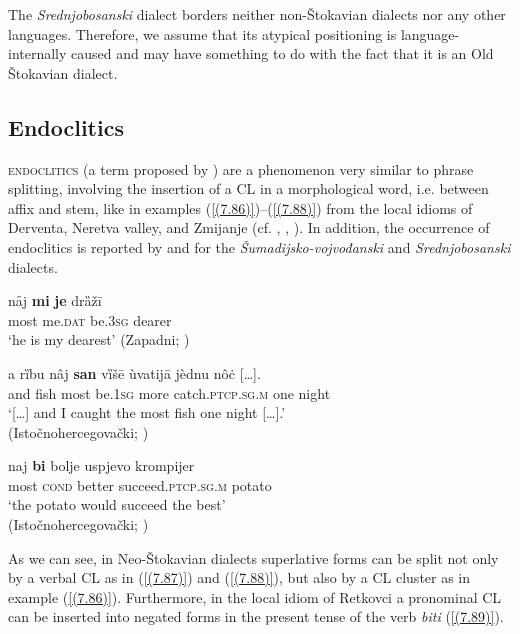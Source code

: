 \noindent The \textit{Srednjobosanski} dialect borders neither non-Štokavian dialects nor any other languages. Therefore, we assume that its atypical positioning is language-in\-ter\-nal\-ly caused and may have something to do with the fact that it is an Old Štokavian dialect.

\subsection{Endoclitics}

\textsc{endoclitics} (a term proposed by \citealt{RadanovicKocic88}) are a phenomenon very similar to phrase splitting, involving the insertion of a CL in a morphological word, i.e. between affix and stem, like in examples (\ref{(7.86)})--(\ref{(7.88)}) from the local idioms of Derventa, Neretva valley, and Zmijanje (cf. \citealt[58]{Lisac03}, \citealt[67]{Okuka08}, \citealt[195]{VuksaNahod14}). In addition, the occurrence of endoclitics is reported by \citet[279]{Nikolic66} and \citet[23]{Halilovic05} for the \textit{Šumadijsko-vojvođanski} and \textit{Srednjobosanski} dialects. 

\begin{exe}\ex\label{(7.86)}
\gll nȃj  \textbf{mi}  \textbf{je}  drȁžī  \\
most me.\textsc{dat}  be.3\textsc{sg}  dearer \\
\glt ‘he is my dearest’
\hfill  (Zapadni; \citealt[58]{Lisac03})

\ex\label{(7.87)}
\gll [\dots] a rȉbu  nâj  \textbf{san}  vȉšē  ùvatijā  jèdnu  {nôċ [\dots].} \\
{} and fish most be.1\textsc{sg} more catch.\textsc{ptcp.sg.m} one night \\
\glt ‘[\dots] and I caught the most fish one night [\dots].’ \\
\hfill  (Istočnohercegovački; \citealt[195]{VuksaNahod14})

\ex\label{(7.88)}
\gll naj  \textbf{bi}  bolje  uspjevo  krompijer  \\
most \textsc{cond} better succeed.\textsc{ptcp.sg.m} potato \\
\glt ‘the potato would succeed the best’ \\
\hfill  (Istočnohercegovački; \citealt[67]{Okuka08})
\end{exe}

\noindent As we can see, in Neo-Štokavian dialects superlative forms can be split not only by a verbal CL as in (\ref{(7.87)}) and (\ref{(7.88)}), but also by a CL cluster  as in example (\ref{(7.86)}). Furthermore, in the local idiom of Retkovci a pronominal CL can be inserted into negated forms in the present tense of the verb \textit{biti} (\ref{(7.89)}). 

